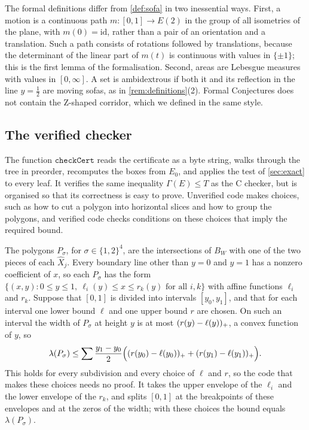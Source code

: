 The formal definitions differ from \cref{def:sofa} in two inessential ways. First, a motion is a continuous path $m\colon[0,1]\to E(2)$ in the group of all isometries of the plane, with $m(0)=\mathrm{id}$, rather than a pair of an orientation and a translation. Such a path consists of rotations followed by translations, because the determinant of the linear part of $m(t)$ is continuous with values in $\{\pm1\}$; this is the first lemma of the formalisation. Second, areas are Lebesgue measures with values in $[0,\infty]$. A set is ambidextrous if both it and its reflection in the line $y=\frac12$ are moving sofas, as in \cref{rem:definitions}(2). Formal Conjectures does not contain the Z-shaped corridor, which we defined in the same style.

\subsection{The verified checker}

The function $\mathtt{checkCert}$ reads the certificate as a byte string, walks through the tree in preorder, recomputes the boxes from $E_0$, and applies the test of \cref{sec:exact} to every leaf. It verifies the same inequality $\Gamma(E)\le T$ as the C checker, but is organised so that its correctness is easy to prove. Unverified code makes choices, such as how to cut a polygon into horizontal slices and how to group the polygons, and verified code checks conditions on these choices that imply the required bound.

The polygons $P_\sigma$, for $\sigma\in\{1,2\}^4$, are the intersections of $B_W$ with one of the two pieces of each $\widehat{X}_j$. Every boundary line other than $y=0$ and $y=1$ has a nonzero coefficient of $x$, so each $P_\sigma$ has the form $\{(x,y):0\le y\le1,\ \ell_i(y)\le x\le r_k(y)\text{ for all }i,k\}$ with affine functions $\ell_i$ and $r_k$. Suppose that $[0,1]$ is divided into intervals $[y_0,y_1]$, and that for each interval one lower bound $\ell$ and one upper bound $r$ are chosen. On such an interval the width of $P_\sigma$ at height $y$ is at most $(r(y)-\ell(y))_{+}$, a convex function of $y$, so
\[
\lambda(P_\sigma)\le\sum\frac{y_1-y_0}{2}\Big((r(y_0)-\ell(y_0))_{+}+(r(y_1)-\ell(y_1))_{+}\Big).
\]
This holds for every subdivision and every choice of $\ell$ and $r$, so the code that makes these choices needs no proof. It takes the upper envelope of the $\ell_i$ and the lower envelope of the $r_k$, and splits $[0,1]$ at the breakpoints of these envelopes and at the zeros of the width; with these choices the bound equals $\lambda(P_\sigma)$.

